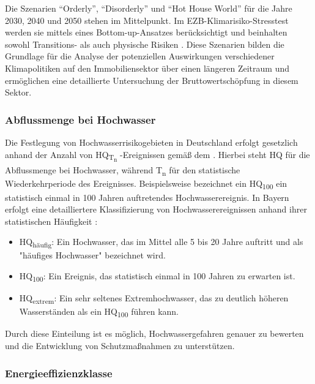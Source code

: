 Die Szenarien "`Orderly"', "`Disorderly"' und "`Hot House World"' für die Jahre 2030, 2040 und 2050 stehen im Mittelpunkt. Im EZB-Klimarisiko-Stresstest werden sie mittels eines Bottom-up-Ansatzes berücksichtigt und beinhalten sowohl Transitions- als auch physische
Risiken \parencite{ECB2022ClimateStressTest}. Diese Szenarien bilden die Grundlage für die Analyse der potenziellen Auswirkungen verschiedener Klimapolitiken auf den Immobiliensektor über einen längeren Zeitraum und ermöglichen eine detaillierte Untersuchung der Bruttowertschöpfung in diesem Sektor.

\subsubsection{Abflussmenge bei Hochwasser}\label{sec:HQ}

Die Festlegung von Hochwasserrisikogebieten in Deutschland erfolgt gesetzlich anhand der Anzahl von HQ\textsubscript{T\textsubscript{n} }-Ereignissen gemäß dem \textcite{WHG73}. Hierbei steht HQ für die Abflussmenge bei Hochwasser, während T\textsubscript{n} für den statistische Wiederkehrperiode des Ereignisses. Beispielsweise bezeichnet ein HQ\textsubscript{100} ein statistisch einmal in 100 Jahren auftretendes Hochwasserereignis.
In Bayern erfolgt eine detailliertere Klassifizierung von Hochwasserereignissen anhand ihrer statistischen Häufigkeit \autocite{BayLfU2019}:
\begin{itemize}
\item HQ\textsubscript{häufig}: Ein Hochwasser, das im Mittel alle 5 bis 20 Jahre auftritt und als "häufiges Hochwasser" bezeichnet wird.
\item HQ\textsubscript{100}: Ein Ereignis, das statistisch einmal in 100 Jahren zu erwarten ist.
\item HQ\textsubscript{extrem}: Ein sehr seltenes Extremhochwasser, das zu deutlich höheren Wasserständen als ein HQ\textsubscript{100} führen kann.
\end{itemize}
Durch diese Einteilung ist es möglich, Hochwassergefahren genauer zu bewerten und die Entwicklung von Schutzmaßnahmen zu unterstützen.

\subsubsection{Energieeffizienzklasse}\label{sec:EPC}

